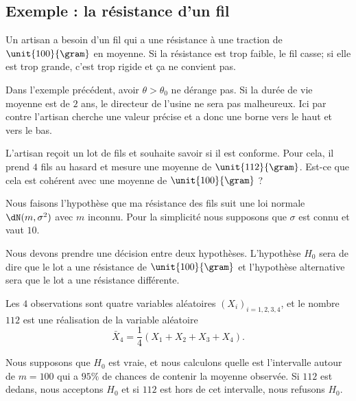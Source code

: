 \subsection{Exemple : la résistance d'un fil}
\label{subsecExempLFilResituzz}

Un artisan a besoin d'un fil qui a une résistance à une traction de \( \unit{100}{\gram}\) en moyenne. Si la résistance est trop faible, le fil casse; si elle est trop grande, c'est trop rigide et ça ne convient pas.

\begin{remark}
	Dans l'exemple précédent, avoir \( \theta>\theta_0\) ne dérange pas. Si la durée de vie moyenne est de \( 2\) ans, le directeur de l'usine ne sera pas malheureux. Ici par contre l'artisan cherche une valeur précise et a donc une borne vers le haut et vers le bas.
\end{remark}

L'artisan reçoit un lot de fils et souhaite savoir si il est conforme. Pour cela, il prend \( 4\) fils au hasard et mesure une moyenne de \( \unit{112}{\gram}\). Est-ce que cela est cohérent avec une moyenne de \( \unit{100}{\gram}\) ?

Nous faisons l'hypothèse que ma résistance des fils suit une loi normale \( \dN(m,\sigma^2)\) avec \( m\) inconnu. Pour la simplicité nous supposons que \( \sigma\) est connu et vaut \( 10\).

Nous devons prendre une décision entre deux hypothèses. L'hypothèse \( H_0\) sera de dire que le lot a une résistance de \( \unit{100}{\gram}\) et l'hypothèse alternative sera que le lot a une résistance différente.

Les \( 4\) observations sont quatre variables aléatoires \( (X_i)_{i=1,2,3,4}\), et le nombre \( 112\) est une réalisation de la variable aléatoire
\begin{equation}
	\bar X_4=\frac{1}{ 4 }(X_1+X_2+X_3+X_4).
\end{equation}

Nous supposons que \( H_0\) est vraie, et nous calculons quelle est l'intervalle autour de \( m=100\) qui a \( 95\%\) de chances de contenir la moyenne observée. Si \( 112\) est dedans, nous acceptons \( H_0\) et si \( 112\) est hors de cet intervalle, nous refusons \( H_0\).

